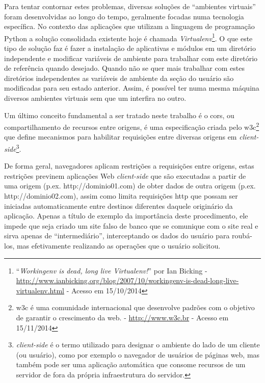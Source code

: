 Para tentar contornar estes problemas, diversas soluções de ``ambientes virtuais'' foram desenvolvidas ao longo do tempo, geralmente focadas numa tecnologia específica. No contexto das aplicações que utilizam a linguagem de programação Python a solução consolidada existente hoje é chamada \textit{Virtualenv}\footnote{``\textit{Workingenv is dead, long live Virtualenv!}'' por Ian Bicking - \url{http://www.ianbicking.org/blog/2007/10/workingenv-is-dead-long-live-virtualenv.html} - Acesso em 15/10/2014}. O que este tipo de solução faz é fazer a instalação de aplicativas e módulos em um diretório independente e modificar variáveis de ambiente para trabalhar com este diretório de referência quando desejado. Quando não se quer mais trabalhar com estes diretórios independentes as variáveis de ambiente da seção do usuário são modificadas para seu estado anterior. Assim, é possível ter numa mesma máquina diversos ambientes virtuais sem que um interfira no outro.

Um último conceito fundamental a ser tratado neste trabalho é o \gls{cors}, ou compartilhamento de recursos entre origens, é uma especificação criada pelo \gls{w3c}\footnote{\gls{w3c} é uma comunidade internacional que desenvolve padrões com o objetivo de garantir o crescimento da web. - \url{http://www.w3c.br} - Acesso em 15/11/2014} que define mecanismos para habilitar requisições entre diversas origens em \textit{client-side}\footnote{\textit{client-side} é o termo utilizado para designar o ambiente do lado de um cliente (ou usuário), como por exemplo o navegador de usuários de páginas web, mas também pode ser uma aplicação automática que consome recursos de um servidor de fora da própria infraestrutura do servidor.}.\cite{van2014cross}

De forma geral, navegadores aplicam restrições a requisições entre origens, estas restrições previnem aplicações Web \textit{client-side} que são executadas a partir de uma origem (p.ex. http://dominio01.com) de obter dados de outra origem (p.ex. http://dominio02.com), assim como limita requisições \gls{http} que possam ser iniciadas automaticamente entre destinos diferentes daquele originário da aplicação. Apenas a título de exemplo da importância deste procedimento, ele impede que seja criado um site falso de banco que se comunique com o site real e sirva apenas de ``intermediário'', interceptando os dados do usuário para roubá-los, mas efetivamente realizando as operações que o usuário solicitou.

